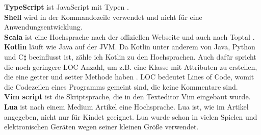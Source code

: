 \documentclass[ngerman]{article}
\begin{document}
    \textbf{TypeScript} ist JavaScript mit Typen \cite{TypeScript}.\\
    \textbf{Shell} wird in der Kommandozeile verwendet und nicht für eine Anwendungsentwicklung.\\
    \textbf{Scala} ist eine Hochsprache nach der offiziellen Webseite \cite{ScalaLevel1} und auch nach Toptal \cite{ScalaLevel2}.\\
    \textbf{Kotlin} läuft wie Java auf der JVM. Da Kotlin unter anderem von Java, Python und C$\sharp$ beeinflusst ist, zähle ich Kotlin zu den Hochsprachen. Auch dafür spricht die noch geringere LOC Anzahl, um z.B. eine Klasse mit Attributen zu erstellen, die eine getter und setter Methode haben \cite{KotlinLanguage}. LOC bedeutet Lines of Code, womit die Codezeilen eines Programms gemeint sind, die keine Kommentare sind.\\
    \textbf{Vim script} ist die Skriptsprache, die in den Texteditor Vim eingebaut wurde.\\
    \textbf{Lua} ist nach einem Medium \cite{LuaLevel} Artikel eine Hochsprache. Lua ist, wie im Artikel angegeben, nicht nur für Kindet geeignet. Lua wurde schon in vielen Spielen und elektronischen Geräten wegen seiner kleinen Größe verwendet.
\end{document}
